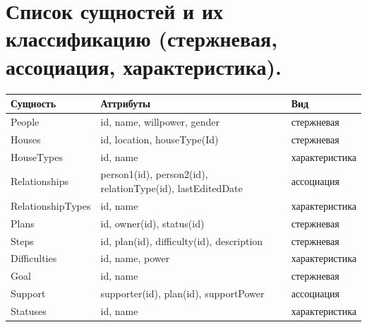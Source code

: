 \documentclass[12pt,onecolumn]{article}
\begin{document}
\section{Список сущностей и их классификацию (стержневая, ассоциация, характеристика).}
\begin{longtable}{|l|l|l|}
  \hline
  \textbf{Сущность} & \textbf{Аттрибуты}                                     & \textbf{Вид}   \\ \hline
  \endfirsthead
  \endhead
  People            & id, name, willpower, gender                            & стержневая     \\ \hline
  Houses            & id, location, houseType(Id)                            & стержневая     \\ \hline
  HouseTypes        & id, name                                               & характеристика \\ \hline
  Relationships     & person1(id), person2(id), relationType(id), lastEditedDate & ассоциация     \\ \hline
  RelationshipTypes & id, name                                               & характеристика \\ \hline
  Plans             & id, owner(id), status(id)                              & стержневая     \\ \hline
  Steps             & id, plan(id), difficulty(id), description              & стержневая     \\ \hline
  Difficulties      & id, name, power                                        & характеристика \\ \hline
  Goal              & id, name                                               & стержневая     \\ \hline
  Support           & supporter(id), plan(id), supportPower                  & ассоциация     \\ \hline
  Statuses          & id, name                                               & характеристика \\ \hline
  \end{longtable}
\end{document}
